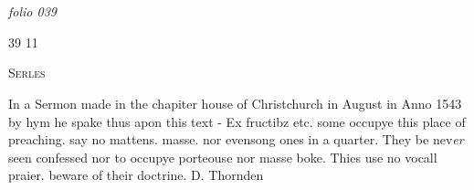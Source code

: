 \documentclass[12pt, a4paper]{book}
\begin{document}
            
\dotfill
					  \subsection*{}  \subsection*{}  \subsection*{}  \subsection*{}  \subsection*{}  \section*{}

\textit{folio 039}



\begin{flushright}{\color{Mahogany}39} 11\end{flushright}
 

	
				\begin{center} \begin{large} {\scshape Serles} \end{large} \end{center}
			
	
				\marginpar[\vspace{0.5cm}{\textcolor{Gray}{sclaunderous}}]{}
			
		
				\marginpar[\vspace{0.5cm}{\textcolor{Gray}{n}}]{}
			
		
		\ifthenelse{\isodd{\thepage}}
		{\reversemarginpar}
		{\normalmarginpar}
		In a Sermon made in the chapiter house of Christchurch
 in August in Anno 1543 by hym he spake thus
 apon this text - Ex fructibz etc. some occupye this
 place of preaching. say no mattens. masse. nor evensong
 ones in a quarter. They be nev\textit{er} seen confessed
 nor to occupye porteouse nor masse boke. Thies
 use no
			 vocall praier. beware of their doctrine. D. Thornden
 
\end{document}
